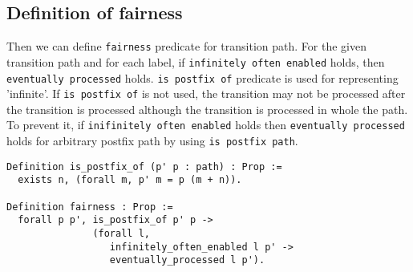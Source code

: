 \subsection{Definition of fairness}
Then we can define \texttt{fairness} predicate for transition path.
For the given transition path and for each label, if \texttt{infinitely often enabled} holds, then \texttt{eventually processed} holds.
\texttt{is postfix of} predicate is used for representing 'infinite'.
If \texttt{is postfix of} is not used, the transition may not be processed after the transition is processed although the transition is processed in whole the path.
To prevent it, if \texttt{inifinitely often enabled} holds then \texttt{eventually processed} holds for arbitrary postfix path by using \texttt{is postfix path}.

\begin{lstlisting}
Definition is_postfix_of (p' p : path) : Prop :=
  exists n, (forall m, p' m = p (m + n)).

Definition fairness : Prop :=
  forall p p', is_postfix_of p' p ->
               (forall l,
                  infinitely_often_enabled l p' ->
                  eventually_processed l p').
\end{lstlisting}
